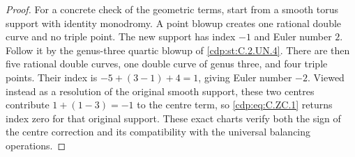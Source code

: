 \begin{proof}
For a concrete check of the geometric
terms, start from a smooth torus support
with identity monodromy. A point blowup
creates one rational double curve and
no triple point. The new support has
index $-1$ and Euler number $2$.
Follow it by the genus-three quartic
blowup of \ref{cdp:st:C.2.UN.4}. There are then five
rational double curves, one double
curve of genus three, and four triple
points. Their index is
$-5+(3-1)+4=1$, giving Euler number
$-2$. Viewed instead as a resolution
of the original smooth support, these
two centres contribute
$1+(1-3)=-1$ to the centre term,
so \eqref{cdp:eq:C.ZC.1} returns index zero for
that original support. These exact
charts verify both the sign of the
centre correction and its compatibility
with the universal balancing operations.
\end{proof}


